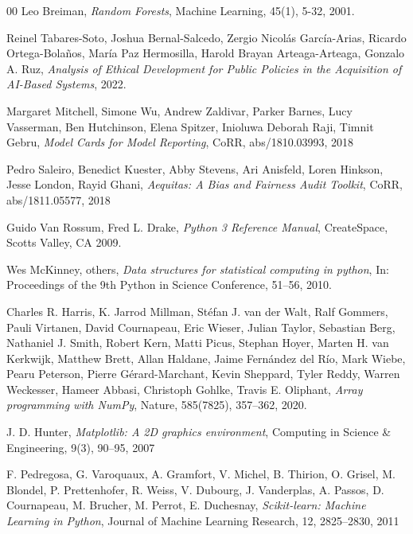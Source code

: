 \documentclass[fleqn,10pt]{wlscirep}
\begin{document}
\begin{thebibliography}{00}
  Leo Breiman,
  \textit{Random Forests},
  Machine Learning,
  45(1),
  5-32,
  2001.


  Reinel Tabares-Soto, Joshua Bernal-Salcedo, Zergio Nicol\'as Garc\'ia-Arias, Ricardo Ortega-Bola\~{n}os, Mar\'ia Paz Hermosilla, Harold Brayan Arteaga-Arteaga, Gonzalo A. Ruz,
  \textit{Analysis of Ethical Development for Public Policies in the Acquisition of AI-Based Systems},
  2022.


  Margaret Mitchell, Simone Wu, Andrew Zaldivar, Parker Barnes, Lucy Vasserman, Ben Hutchinson, Elena Spitzer, Inioluwa Deborah Raji, Timnit Gebru,
  \textit{Model Cards for Model Reporting},
  CoRR,
  abs/1810.03993,
  {2018}     %


  Pedro Saleiro, Benedict Kuester, Abby Stevens, Ari Anisfeld, Loren Hinkson, Jesse London, Rayid Ghani,
  \textit{Aequitas: {A} Bias and Fairness Audit Toolkit},
  CoRR,
  abs/1811.05577,
  {2018}   %


  Guido Van Rossum, Fred L. Drake,
  \textit{Python 3 Reference Manual},
  CreateSpace, {Scotts Valley, CA}  %
  2009.


  Wes McKinney, others,
  \textit{Data structures for statistical computing in python},
  In: Proceedings of the 9th Python in Science Conference,
  51--56,
  2010.


  Charles R. Harris, K. Jarrod Millman, St\'{e}fan J. van der Walt, Ralf Gommers, Pauli Virtanen, David Cournapeau, Eric Wieser, Julian Taylor, Sebastian Berg, Nathaniel J. Smith, Robert Kern, Matti Picus, Stephan Hoyer, Marten H. van Kerkwijk, Matthew Brett, Allan Haldane, Jaime Fern\'{a}ndez del R\'{i}o, Mark Wiebe, Pearu Peterson, Pierre G\'{e}rard-Marchant, Kevin Sheppard, Tyler Reddy, Warren Weckesser, Hameer Abbasi, Christoph Gohlke, Travis E. Oliphant,
  \textit{Array programming with {NumPy}},
  Nature,
  585(7825),
  357--362,
  2020.


  J. D. Hunter,
  \textit{Matplotlib: A 2D graphics environment},
  Computing in Science \& Engineering,
  9(3),
  90--95,
  2007  %


  F. Pedregosa, G. Varoquaux, A. Gramfort, V. Michel, B. Thirion, O. Grisel, M. Blondel, P. Prettenhofer, R. Weiss, V. Dubourg, J. Vanderplas, A. Passos, D. Cournapeau, M. Brucher, M. Perrot, E. Duchesnay,
  \textit{Scikit-learn: Machine Learning in {P}ython},
  Journal of Machine Learning Research,
  12,
  2825--2830,
  {2011}  %



\end{thebibliography}
\end{document}
